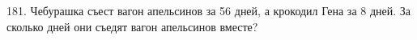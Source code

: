 181. Чебурашка съест вагон апельсинов за 56 дней, а крокодил Гена за 8 дней. За сколько дней они съедят вагон апельсинов вместе?\\
